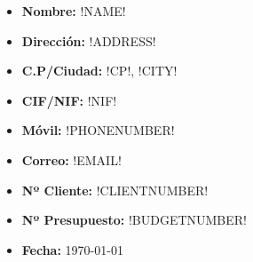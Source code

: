 \pagestyle{empty}
\AddToShipoutPicture{\BackgroundPic}	

  \begin{minipage}{\linewidth}
      \begin{minipage}{0.475\linewidth}
\begin{caja}[frametitle=Datos del cliente,userdefinedwidth=8cm,align=center]
	\begin{itemize}
		\item \textbf{Nombre: }!NAME!
		\item \textbf{Dirección: }!ADDRESS!
		\item \textbf{C.P/Ciudad: }!CP!, !CITY!
		\item \textbf{CIF/NIF: }!NIF!
		\item \textbf{Móvil: }!PHONENUMBER!
		\item \textbf{Correo: }!EMAIL!
	\end{itemize}
\end{caja}
      \end{minipage}
      \begin{minipage}{0.475\linewidth}
\begin{caja}[frametitle=Datos del presupuesto,userdefinedwidth=8cm,align=center]
	\begin{itemize}
		\item \textbf{Nº Cliente: }!CLIENTNUMBER!
		\item \textbf{Nº Presupuesto: }!BUDGETNUMBER!
		\item \textbf{Fecha: }\today
	\end{itemize}
\end{caja}
      \end{minipage}
  \end{minipage}

\vspace{0.5cm}

